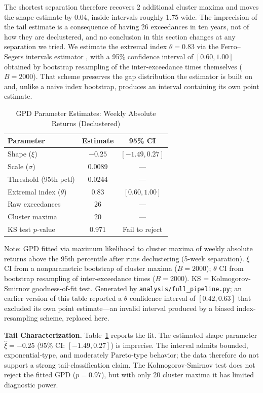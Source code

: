 \documentclass[11pt]{article}
\begin{document}
The shortest separation therefore recovers 2 additional cluster maxima and moves the shape estimate by 0.04, inside intervals roughly 1.75 wide. The imprecision of the tail estimate is a consequence of having 26 exceedances in ten years, not of how they are declustered, and no conclusion in this section changes at any separation we tried. We estimate the extremal index $\theta = 0.83$ via the Ferro--Segers intervals estimator \citep{ferro2003inference}, with a 95\% confidence interval of $[0.60, 1.00]$ obtained by bootstrap resampling of the inter-exceedance times themselves ($B = 2000$). That scheme preserves the gap distribution the estimator is built on and, unlike a naive index bootstrap, produces an interval containing its own point estimate.

\begin{table}[H]
\centering
\caption{GPD Parameter Estimates: Weekly Absolute Returns (Declustered)}
\label{tab:gpd}
\small
\begin{tabular}{@{}lcc@{}}
\toprule
Parameter & Estimate & 95\% CI \\
\midrule
Shape ($\xi$) & $-0.25$ & $[-1.49, 0.27]$ \\
Scale ($\sigma$) & 0.0089 & --- \\
Threshold (95th pctl) & 0.0244 & --- \\
Extremal index ($\theta$) & 0.83 & $[0.60, 1.00]$ \\
Raw exceedances & 26 & --- \\
Cluster maxima & 20 & --- \\
KS test $p$-value & 0.971 & Fail to reject \\
\bottomrule
\end{tabular}
\par\vspace{0.3em}
\parbox{\linewidth}{\footnotesize Note: GPD fitted via maximum likelihood to cluster maxima of weekly absolute returns above the 95th percentile after runs declustering (5-week separation). $\xi$ CI from a nonparametric bootstrap of cluster maxima ($B = 2000$); $\theta$ CI from bootstrap resampling of inter-exceedance times ($B = 2000$). KS = Kolmogorov-Smirnov goodness-of-fit test. Generated by \texttt{analysis/full\_pipeline.py}; an earlier version of this table reported a $\theta$ confidence interval of $[0.42, 0.63]$ that excluded its own point estimate---an invalid interval produced by a biased index-resampling scheme, replaced here.}
\end{table}

\textbf{Tail Characterization.} Table~\ref{tab:gpd} reports the fit. The estimated shape parameter $\hat{\xi} = -0.25$ (95\% CI: $[-1.49, 0.27]$) is imprecise. The interval admits bounded, exponential-type, and moderately Pareto-type behavior; the data therefore do not support a strong tail-classification claim. The Kolmogorov-Smirnov test does not reject the fitted GPD ($p = 0.97$), but with only 20 cluster maxima it has limited diagnostic power.
\end{document}

